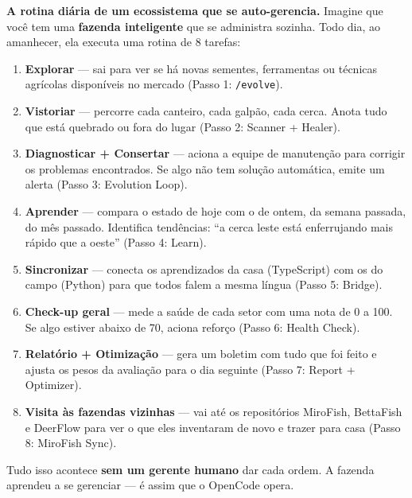 \documentclass[
  article,
  12pt,
  oneside,
  a4paper,
  brazil,
  sumario=tradicional
]{abntex2}
\begin{document}
\begin{leigosbox}
\textbf{A rotina diária de um ecossistema que se auto-gerencia.} Imagine que você tem uma \textbf{fazenda inteligente} que se administra sozinha. Todo dia, ao amanhecer, ela executa uma rotina de 8 tarefas:

\begin{enumerate}
\item[\textbf{6h}] \textbf{Explorar} --- sai para ver se há novas sementes, ferramentas ou técnicas agrícolas disponíveis no mercado (Passo 1: \texttt{/evolve}).
\item[\textbf{7h}] \textbf{Vistoriar} --- percorre cada canteiro, cada galpão, cada cerca. Anota tudo que está quebrado ou fora do lugar (Passo 2: Scanner + Healer).
\item[\textbf{8h}] \textbf{Diagnosticar + Consertar} --- aciona a equipe de manutenção para corrigir os problemas encontrados. Se algo não tem solução automática, emite um alerta (Passo 3: Evolution Loop).
\item[\textbf{9h}] \textbf{Aprender} --- compara o estado de hoje com o de ontem, da semana passada, do mês passado. Identifica tendências: ``a cerca leste está enferrujando mais rápido que a oeste'' (Passo 4: Learn).
\item[\textbf{10h}] \textbf{Sincronizar} --- conecta os aprendizados da casa (TypeScript) com os do campo (Python) para que todos falem a mesma língua (Passo 5: Bridge).
\item[\textbf{11h}] \textbf{Check-up geral} --- mede a saúde de cada setor com uma nota de 0 a 100. Se algo estiver abaixo de 70, aciona reforço (Passo 6: Health Check).
\item[\textbf{12h}] \textbf{Relatório + Otimização} --- gera um boletim com tudo que foi feito e ajusta os pesos da avaliação para o dia seguinte (Passo 7: Report + Optimizer).
\item[\textbf{Semanal}] \textbf{Visita às fazendas vizinhas} --- vai até os repositórios MiroFish, BettaFish e DeerFlow para ver o que eles inventaram de novo e trazer para casa (Passo 8: MiroFish Sync).
\end{enumerate}

\noindent Tudo isso acontece \textbf{sem um gerente humano} dar cada ordem. A fazenda aprendeu a se gerenciar --- é assim que o OpenCode opera.
\end{leigosbox}
\end{document}
